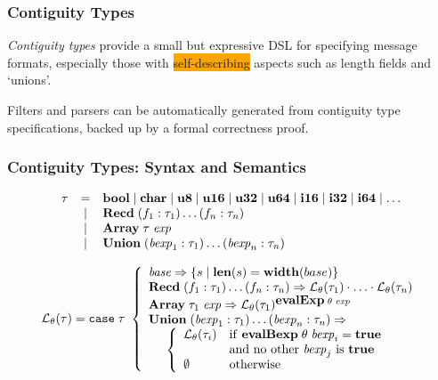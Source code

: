 \documentclass{beamer}
\newcommand{\kemph}[1]{\colorbox{orange}{#1}}
\newcommand{\konst}[1]{\ensuremath{\mbox{\bf{#1}}}}
\newcommand{\set}[1]{\{ {#1} \}}
\newcommand{\LangTheta}[1]{\ensuremath{{\mathcal L}_{\theta}({#1})}}
\begin{document}
\begin{frame}\frametitle{Contiguity Types}

  \emph{Contiguity types} provide a small but expressive DSL for
specifying message formats, especially those with
\kemph{self-describing} aspects such as length fields and
`unions'.

\vspace*{5mm}
Filters and parsers can be automatically generated from
contiguity type specifications, backed up by a formal correctness
proof.

\end{frame}

\begin{frame}\frametitle{Contiguity Types: Syntax and Semantics}

\[
\begin{array}{rcl}
 \tau & = & \konst{bool} \mid \konst{char} \mid \konst{u8} \mid
 \konst{u16} \mid \konst{u32} \mid \konst{u64}  \mid \konst{i16} \mid
 \konst{i32} \mid \konst{i64} \mid \ldots \\
      & \mid & \konst{Recd}\; (f_1 : \tau_1) \ldots (f_n : \tau_n) \\
      & \mid & \konst{Array}\; \tau \; \mathit{exp} \\
      & \mid & \konst{Union}\; (\mathit{bexp}_1 : \tau_1) \ldots (\mathit{bexp}_n : \tau_n)
\end{array}
\]


\[
\LangTheta{\tau} =
\mathtt{case}\; \tau\
 \left\{
 \begin{array}{l}
 \mathit{base} \Rightarrow \set{s \mid \konst{len}(s) = \konst{width}(base)} \\
 \konst{Recd}\; (f_1 : \tau_1) \ldots (f_n : \tau_n)
      \Rightarrow \LangTheta{\tau_1} \cdot \ldots \cdot \LangTheta{\tau_n}
\\
 \konst{Array}\; \tau_1 \; \mathit{exp}
      \Rightarrow  \LangTheta{\tau_1}^{\konst{evalExp}\;\theta\;\mathit{exp}}
\\
 \konst{Union}\; (\mathit{bexp}_1 : \tau_1) \ldots (\mathit{bexp}_n : \tau_n) \Rightarrow \\
  \hspace*{5mm}
 \left\{
 \begin{array}{ll}
    \LangTheta{\tau_i} &  \mathrm{if}\ \konst{evalBexp}\;\theta\;\mathit{bexp}_i = \konst{true} \\
                  & \mathrm{and\ no\ other}\ \mathit{bexp}_j\ \mathrm{is}\ \konst{true}  \\
    \emptyset & \mathrm{otherwise}
 \end{array}
 \right.
 \\
\end{array}
 \right.
\]

\end{frame}
\end{document}
